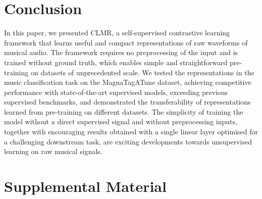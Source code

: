 \documentclass{report}
\begin{document}
\chapter{Conclusion}
In this paper, we presented CLMR, a self-supervised contrastive learning framework that learns useful and compact representations of raw waveforms of musical audio. The framework requires no preprocessing of the input and is trained without ground truth, which enables simple and straightforward pre-training on datasets of unprecedented scale. We tested the representations in the music classification task on the MagnaTagATune dataset, achieving competitive performance with state-of-the-art supervised models, exceeding previous supervised benchmarks, and demonstrated the transferability of representations learned from pre-training on different datasets. The simplicity of training the model without a direct supervised signal and without preprocessing inputs, together with encouraging results obtained with a single linear layer optimised for a challenging downstream task, are exciting developments towards unsupervised learning on raw musical signals.







\chapter*{Supplemental Material}
\end{document}
